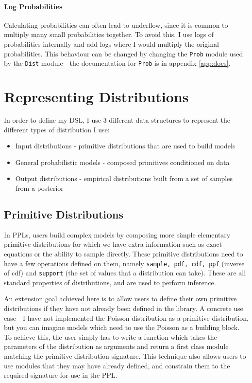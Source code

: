 \paragraph{Log Probabilities} 
Calculating probabilities can often lead to underflow, since it is common to multiply many small probabilities together. To avoid this, I use logs of probabilities internally and add logs where I would multiply the original probabilities. This behaviour can be changed by changing the \texttt{Prob} module used by the \texttt{Dist} module - the documentation for \texttt{Prob} is in appendix \ref{app:docs}.
	
\section{Representing Distributions}
In order to define my DSL, I use 3 different data structures to represent the different types of distribution I use:
\begin{itemize}
	\item Input distributions - primitive distributions that are used to build models
	\item General probabilistic models - composed primitives conditioned on data
	\item Output distributions - empirical distributions built from a set of samples from a posterior
\end{itemize}
\vspace{2mm}
\subsection{Primitive Distributions}
In PPLs, users build complex models by composing more simple elementary primitive distributions for which we have extra information such as exact equations or the ability to sample directly. These primitive distributions need to have a few operations defined on them, namely \texttt{sample, pdf, cdf, ppf} (inverse of cdf) and \texttt{support} (the set of values that a distribution can take). These are all standard properties of distributions, and are used to perform inference.

An extension goal achieved here is to allow users to define their own primitive distributions if they have not already been defined in the library. A concrete use case - I have not implemented the Poisson distribution as a primitive distribution, but you can imagine models which need to use the Poisson as a building block. To achieve this, the user simply has to write a function which takes the parameters of the distribution as arguments and return a first class module matching the primitive distribution signature. This technique also allows users to use modules that they may have already defined, and constrain them to the required signature for use in the PPL.
	
